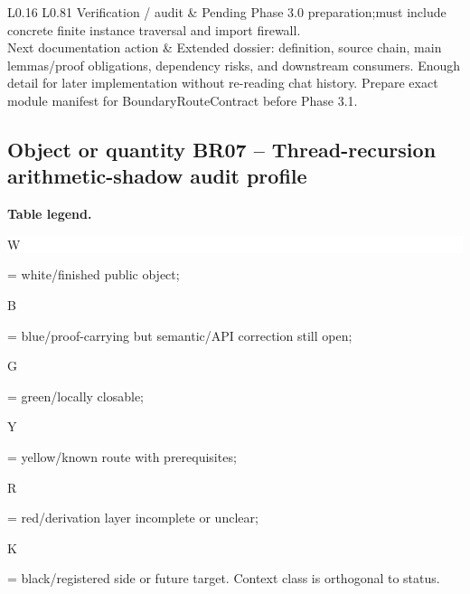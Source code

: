 \begin{longtable}{L{0.16\linewidth} L{0.81\linewidth}}
\hline\addlinespace[0.20em]
Verification /\allowbreak{} audit & Pending Phase 3.0 preparation;\newline must include concrete finite instance traversal and import firewall.\\
\hline\addlinespace[0.20em]
Next documentation action & Extended dossier: definition, source chain, main lemmas/\allowbreak{}proof obligations, dependency risks, and downstream consumers. Enough detail for later implementation without re-reading chat history. Prepare exact module manifest for BoundaryRouteContract before Phase 3.1.\\
\hline\addlinespace[0.20em]
\end{longtable}
\subsection*{Object or quantity BR07 -- Thread-recursion arithmetic-shadow audit profile}
\hypertarget{objproof:BR07}{}
\par\smallskip\noindent\begin{minipage}{0.99\linewidth}\footnotesize\raggedright\textbf{Table legend.} \colorbox{white}{\strut W} = white/finished public object; \colorbox{cyan!20}{\strut B} = blue/proof-carrying but semantic/API correction still open; \colorbox{green!18}{\strut G} = green/locally closable; \colorbox{yellow!25}{\strut Y} = yellow/known route with prerequisites; \colorbox{red!20}{\strut R} = red/derivation layer incomplete or unclear; \colorbox{black!18}{\strut K} = black/registered side or future target. Context class is orthogonal to status.\end{minipage}\par\vspace{0.25em}
